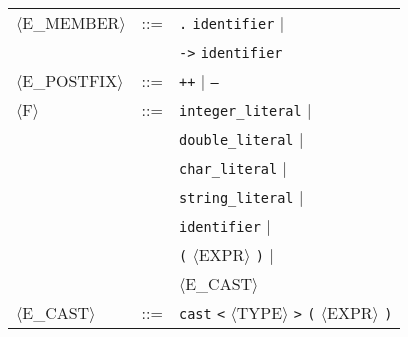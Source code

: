 \begin{footnotesize}
\begin{longtable}{>{\raggedright\arraybackslash}p{4cm}@{\ }>{\raggedright\arraybackslash}p{1.5cm}@{\ }>{\raggedright\arraybackslash}p{8.5cm}}
      $\langle$E\_MEMBER$\rangle$ & ::= & \texttt{.} \texttt{identifier} $\mid$ \\
      & & \texttt{->} \texttt{identifier} \\
      
      $\langle$E\_POSTFIX$\rangle$ & ::= & \texttt{++} $\mid$ \texttt{--} \\
      
      $\langle$F$\rangle$ & ::= & \texttt{integer\_literal} $\mid$ \\
      & & \texttt{double\_literal} $\mid$ \\
      & & \texttt{char\_literal} $\mid$ \\
      & & \texttt{string\_literal} $\mid$ \\
      & & \texttt{identifier} $\mid$ \\
      & & \texttt{(} $\langle$EXPR$\rangle$ \texttt{)} $\mid$ \\
      & & $\langle$E\_CAST$\rangle$ \\
      
      $\langle$E\_CAST$\rangle$ & ::= & \texttt{cast} \texttt{<} $\langle$TYPE$\rangle$ \texttt{>} \texttt{(} $\langle$EXPR$\rangle$ \texttt{)}
\end{longtable}
\end{footnotesize}